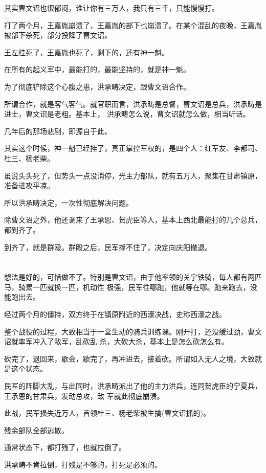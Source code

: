 \documentclass[11pt,a4paper,onecolumn]{article}
\begin{document}
其实曹文诏也很郁闷，谁让你有三万人，我只有三千，只能慢慢打。

打了两个月，王嘉胤崩溃了，王嘉胤的部下也崩溃了。在某个混乱的夜晚，王嘉胤被部下杀死，部分投降了曹文诏。

王左桂死了，王嘉胤也死了，剩下的，还有神一魁。

在所有的起义军中，最能打的，最能坚持的，就是神一魁。

为了彻底铲除这个心腹之患，洪承畴决定，跟曹文诏合作。

所谓合作，就是客气客气。就官职而言，洪承畴是总督，曹文诏是总兵，洪承畴是进士，曹文诏是老粗。基本上，
洪承畴怎么说，曹文诏就怎么做，相当听话。

几年后的那场悲剧，即源自于此。

其实这个时候，神一魁已经挂了，真正掌控军权的，是四个人：红军友、李都司、杜三、杨老柴。

虽说头头死了，但势头一点没消停，光主力部队，就有五万人，聚集在甘肃镇原，准备进攻平凉。

所以洪承畴决定，一次性彻底解决问题。

除曹文诏之外，他还调来了王承恩、贺虎臣等人，基本上西北最能打的几个总兵，都到齐了。

到齐了，就是群殴。群殴之后，民军撑不住了，决定向庆阳撤退。

\section[\thesection]{}

想法是好的，可惜做不了。特别是曹文诏，由于他率领的关宁铁骑，每人都有两匹马，骑累一匹就换一匹，机动性
极强，民军往哪跑，他就等在哪。跑来跑去，没能跑出去。

经过两个月的僵持，双方终于在镇原附近的西濠决战，史称西濠之战。

整个战役的过程，大致相当于一堂生动的骑兵训练课。刚开打，还没缓过劲，曹文诏就率军冲入了敌军，乱砍乱
杀，大砍大杀，基本上是怎么砍怎么有。

砍完了，退回来，歇会，歇完了，再冲进去，接着砍。所谓如入无人之境，大致就是这个状态。

民军的阵脚大乱，与此同时，洪承畴派出了他的主力洪兵，连同贺虎臣的宁夏兵，王承恩的甘肃兵，发动总攻，敌
军就此彻底崩溃。

此战，民军损失近万人，首领杜三、杨老柴被生擒(曹文诏抓的)。

残余部队全部逃散。

通常状态下，都打残了，也就拉倒了。

洪承畴不肯拉倒，打残是不够的，打死是必须的。
\end{document}
